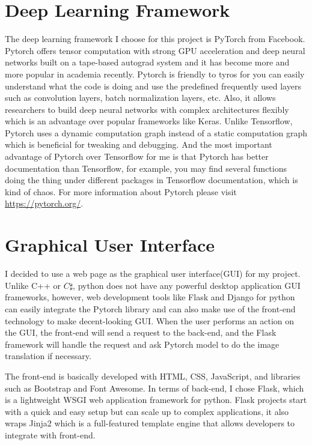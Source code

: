 \section{Deep Learning Framework}
The deep learning framework I choose for this project is PyTorch from Facebook. 
Pytorch offers tensor computation with strong GPU acceleration and deep neural 
networks built on a tape-based autograd system and it has become 
more and more popular in academia recently. Pytorch is friendly to tyros for 
you can easily understand what the code is doing and use the predefined 
frequently used layers such as convolution layers, batch normalization layers, 
etc. Also, it allows researchers to build deep neural networks with complex 
architectures flexibly which is an advantage over popular frameworks like Keras.
Unlike Tensorflow, Pytorch uses a dynamic computation graph instead 
of a static computation graph which is beneficial for tweaking and debugging. And 
the most important advantage of Pytorch over Tensorflow for me is that Pytorch 
has better documentation than Tensorflow, for example, you may find several 
functions doing the thing under different packages in Tensorflow documentation,
which is kind of chaos. For more information about Pytorch please visit 
\href{https://pytorch.org/}{https://pytorch.org/}.

\section{Graphical User Interface}
I decided to use a web page as the graphical user interface(GUI) for my project.
Unlike C++ or $C\sharp$, python does not have any powerful desktop application GUI 
frameworks, however, 
web development tools like Flask and Django for python can easily integrate the Pytorch 
library and can also make use of the front-end technology to make decent-looking 
GUI. When the user performs an action on the GUI, the front-end will send a request to 
the back-end, and the Flask framework will handle the request and ask Pytorch model to 
do the image translation if necessary. 

The front-end is basically developed with HTML, 
CSS, JavaScript, and libraries such as Bootstrap and Font Awesome.
In terms of back-end, I chose Flask, which is a lightweight WSGI web application 
framework for python. Flask projects start with a quick and easy setup but can scale 
up to complex applications, it also wraps Jinja2 which is a full-featured template 
engine that allows developers to integrate with front-end. 

